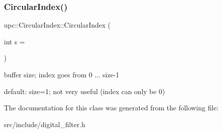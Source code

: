 \subsubsection{\texorpdfstring{Circular\+Index()}{CircularIndex()}}
{\footnotesize\ttfamily upc\+::\+Circular\+Index\+::\+Circular\+Index (\begin{DoxyParamCaption}\item[{int}]{s = {} }\end{DoxyParamCaption})\hspace{0.3cm}{\ttfamily [inline]}}



buffer size; index goes from 0 ... size-\/1 

default\+: size=1; not very useful (index can only be 0) 

The documentation for this class was generated from the following file\+:\begin{DoxyCompactItemize}
\item 
src/include/digital\+\_\+filter.\+h\end{DoxyCompactItemize}

